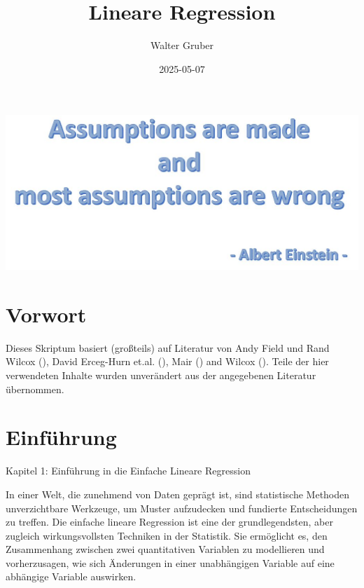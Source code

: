 \documentclass[
]{article}
\title{Lineare Regression}
\author{Walter Gruber}
\date{2025-05-07}
\begin{document}
\maketitle

{
\setcounter{tocdepth}{2}
\tableofcontents
}
\section*{}\label{section}

\includegraphics[width=1\textwidth,height=\textheight]{Images/Assumptions.JPG}

\section*{Vorwort}\label{vorwort}

Dieses Skriptum basiert (großteils) auf Literatur von Andy Field und Rand Wilcox (), David Erceg-Hurn et.al. (), Mair () and Wilcox (). Teile der hier verwendeten Inhalte wurden unverändert aus der angegebenen Literatur übernommen.

\section*{Einführung}\label{einfuxfchrung}

Kapitel 1: Einführung in die Einfache Lineare Regression

In einer Welt, die zunehmend von Daten geprägt ist, sind statistische Methoden unverzichtbare Werkzeuge, um Muster aufzudecken und fundierte Entscheidungen zu treffen. Die einfache lineare Regression ist eine der grundlegendsten, aber zugleich wirkungsvollsten Techniken in der Statistik. Sie ermöglicht es, den Zusammenhang zwischen zwei quantitativen Variablen zu modellieren und vorherzusagen, wie sich Änderungen in einer unabhängigen Variable auf eine abhängige Variable auswirken.
\end{document}
